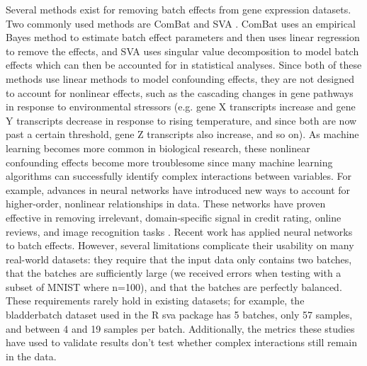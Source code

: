 \documentclass[12pt]{article}
\begin{document}
Several methods exist for removing batch effects from gene expression datasets.
Two commonly used methods are ComBat \citep{johnson_adjusting_2007} and SVA \citep{leek_capturing_2007}.
ComBat uses an empirical Bayes method to estimate batch effect parameters and then uses linear regression to remove the effects, and SVA uses singular value decomposition to model batch effects which can then be accounted for in statistical analyses.
Since both of these methods use linear methods to model confounding effects, they are not designed to account for nonlinear effects, such as the cascading changes in gene pathways in response to environmental stressors (e.g. gene X transcripts increase and gene Y transcripts decrease in response to rising temperature, and since both are now past a certain threshold, gene Z transcripts also increase, and so on).
As machine learning becomes more common in biological research, these nonlinear confounding effects become more troublesome since many machine learning algorithms can successfully identify complex interactions between variables.
For example, advances in neural networks have introduced new ways to account for higher-order, nonlinear relationships in data.
These networks have proven effective in removing irrelevant, domain-specific signal in credit rating, online reviews, and image recognition tasks \citep{louizos_variational_2015}.
Recent work \cite{shaham_removal_2017,shaham_batch_2018,upadhyay_removal_2019} has applied neural networks to batch effects.
However, several limitations complicate their usability on many real-world datasets:
they require that the input data only contains two batches, that the batches are sufficiently large (we received errors when testing with a subset of MNIST where n=100), and that the batches are perfectly balanced.
These requirements rarely hold in existing datasets; for example, the bladderbatch dataset used in the R sva package \cite{leek_bladderbatch_2017,leek_sva_2017} has 5 batches, only 57 samples, and between 4 and 19 samples per batch.
Additionally, the metrics these studies have used to validate results don't test whether complex interactions still remain in the data.
\end{document}
